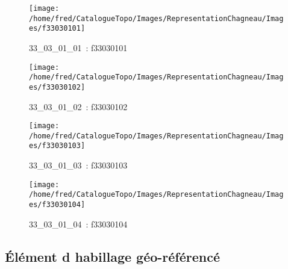 \documentclass[12pt,titlepage]{book}
\begin{document}
\begin{figure}[h!]
  \hfill         %
  \begin{minipage}[t]{3cm}
    \begin{center}
      \texttt{[image: /home/fred/CatalogueTopo/Images/RepresentationChagneau/Images/f33030101]}
      \caption[~33\_03\_01\_01]{\small{33\_03\_01\_01~:} \tiny{f33030101}}\label{f33030101}
    \end{center}
  \end{minipage}
  \begin{minipage}[t]{3cm}
    \begin{center}
      \texttt{[image: /home/fred/CatalogueTopo/Images/RepresentationChagneau/Images/f33030102]}
      \caption[~33\_03\_01\_02]{\small{33\_03\_01\_02~:} \tiny{f33030102}}\label{f33030102}
    \end{center}
  \end{minipage}
  \begin{minipage}[t]{3cm}
    \begin{center}
      \texttt{[image: /home/fred/CatalogueTopo/Images/RepresentationChagneau/Images/f33030103]}
      \caption[~33\_03\_01\_03]{\small{33\_03\_01\_03~:} \tiny{f33030103}}\label{f33030103}
    \end{center}
  \end{minipage}
  \begin{minipage}[t]{3cm}
    \begin{center}
      \texttt{[image: /home/fred/CatalogueTopo/Images/RepresentationChagneau/Images/f33030104]}
      \caption[~33\_03\_01\_04]{\small{33\_03\_01\_04~:} \tiny{f33030104}}\label{f33030104}
    \end{center}
  \end{minipage}
\end{figure}


\subsection{Élément d habillage géo-référencé}
\noindent
\vspace{\baselineskip}
\end{document}
